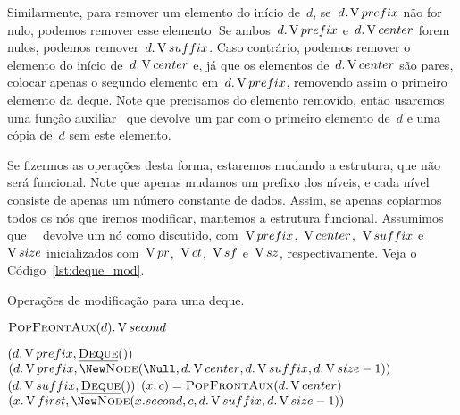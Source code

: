 \documentclass[main.tex]{subfiles}
\begin{document}
Similarmente, para remover um elemento do início de~$d$, se~$d.\operatorname{V}{prefix}$ não for nulo, podemos remover esse elemento. Se ambos~$d.\operatorname{V}{prefix}$ e~$d.\operatorname{V}{center}$ forem nulos, podemos remover~$d.\operatorname{V}{suffix}$. Caso contrário, podemos remover o elemento do início de~$d.\operatorname{V}{center}$ e, já que os elementos de~$d.\operatorname{V}{center}$ são pares, colocar apenas o segundo elemento em~$d.\operatorname{V}{prefix}$, removendo assim o primeiro elemento da deque. Note que precisamos do elemento removido, então usaremos uma função auxiliar~ que devolve um par com o primeiro elemento de~$d$ e uma cópia de~$d$ sem este elemento.

Se fizermos as operações desta forma, estaremos mudando a estrutura, que não será funcional. Note que apenas mudamos um prefixo dos níveis, e cada nível consiste de apenas um número constante de dados.
Assim, se apenas copiarmos todos os nós que iremos modificar, mantemos a estrutura funcional. Assumimos que~\mbox{ } devolve um nó como discutido, com~$\operatorname{V}{prefix}$,~$\operatorname{V}{center}$,~$\operatorname{V}{suffix}$ e~$\operatorname{V}{size}$ inicializados com~$\operatorname{V}{pr}$,~$\operatorname{V}{ct}$,~$\operatorname{V}{sf}$ e~$\operatorname{V}{sz}$, respectivamente. Veja o Código~\ref{lst:deque_mod}.

\begin{algorithm}
\caption{Operações de modificação para uma deque.} \label{lst:deque_mod}
\begin{algorithmic}[1]

		\State \Return \New {} \label{line:dm:puf1}
	 \label{line:dm:puf2}
		\State \Return \New {}\label{line:dm:puf2_1}
	\Else
		\State \Return \New {} \label{line:dm:puf3}
	\EndIf
\EndFunction

	\State \Return $\Call{PopFrontAux}{d}.\V{second}$
\EndFunction


	 \label{line:dm:pof0}
		\State \Return $(d.\operatorname{V}{prefix}, \mbox{\textsc{\underline{Deque}}\ensuremath{()}})$ \label{line:dm:pof00}
	 \label{line:dm:pof1}
		\State \Return $(d.\V{prefix}, \New \Call{Node}{\Null, d.\V{center}, d.\V{suffix}, d.\V{size} - 1})$ \label{line:dm:pof1_2}
	 \label{line:dm:pof2}
		\State \Return $(d.\V{suffix}, \funcAPI{Deque}{\null})$ \label{line:dm:pof2-0}
	\Else
		\State $(x, c) = \Call{PopFrontAux}{d.\V{center}}$
		\State \Return $(x.\V{first}, \New \Call{Node}{x.second, c, d.\V{suffix}, d.\V{size} - 1})$ \label{line:dm:pof3}
	\EndIf
\EndFunction

\end{algorithmic}
\end{algorithm}
\end{document}
